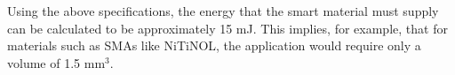 Using the above specifications, the energy that the smart material must supply can be calculated to be approximately 15 mJ. This implies, for example, that for materials such as SMAs like NiTiNOL, the application would require only a volume of 1.5 mm$^3$.
%
%
%
%

